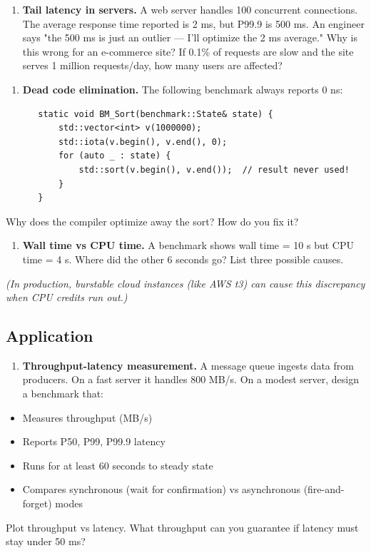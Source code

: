 \begin{enumerate}
\item \textbf{Tail latency in servers.} A web server handles 100 concurrent connections. The average response time reported is 2 ms, but P99.9 is 500 ms. An engineer says "the 500 ms is just an outlier — I'll optimize the 2 ms average." Why is this wrong for an e-commerce site? If 0.1\% of requests are slow and the site serves 1 million requests/day, how many users are affected?
\end{enumerate}

\begin{enumerate}
\item \textbf{Dead code elimination.} The following benchmark always reports 0 ns:
\begin{lstlisting}
   static void BM_Sort(benchmark::State& state) {
       std::vector<int> v(1000000);
       std::iota(v.begin(), v.end(), 0);
       for (auto _ : state) {
           std::sort(v.begin(), v.end());  // result never used!
       }
   }
\end{lstlisting}
\end{enumerate}
   Why does the compiler optimize away the sort? How do you fix it?

\begin{enumerate}
\item \textbf{Wall time vs CPU time.} A benchmark shows wall time = 10 s but CPU time = 4 s. Where did the other 6 seconds go? List three possible causes.
\end{enumerate}

   \textit{(In production, burstable cloud instances (like AWS t3) can cause this discrepancy when CPU credits run out.)}

\subsection{Application}

\begin{enumerate}
\item \textbf{Throughput-latency measurement.} A message queue ingests data from producers. On a fast server it handles 800 MB/s. On a modest server, design a benchmark that:
\end{enumerate}
\begin{itemize}
\item Measures throughput (MB/s)
\item Reports P50, P99, P99.9 latency
\item Runs for at least 60 seconds to steady state
\item Compares synchronous (wait for confirmation) vs asynchronous (fire-and-forget) modes
\end{itemize}
   Plot throughput vs latency. What throughput can you guarantee if latency must stay under 50 ms?


